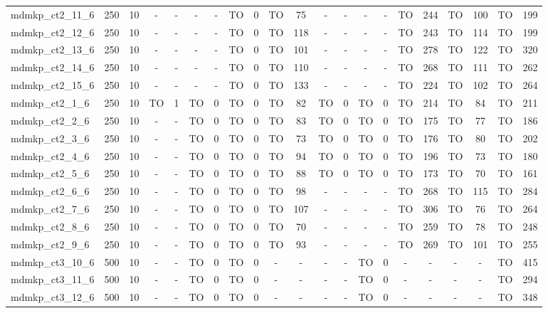 \begin{sidewaystable}[!ht]
{\begin{tabular}{lcccccccccccccccccccc}
mdmkp\_ct2\_11\_6 & 250 & 10 &  - &  - &  - &  - & TO & 0 & TO & 75 &  - &  - &  - &  - & TO & 244 & TO & 100 & TO & 199 \\
mdmkp\_ct2\_12\_6 & 250 & 10 &  - &  - &  - &  - & TO & 0 & TO & 118 &  - &  - &  - &  - & TO & 243 & TO & 114 & TO & 199 \\
mdmkp\_ct2\_13\_6 & 250 & 10 &  - &  - &  - &  - & TO & 0 & TO & 101 &  - &  - &  - &  - & TO & 278 & TO & 122 & TO & 320 \\
mdmkp\_ct2\_14\_6 & 250 & 10 &  - &  - &  - &  - & TO & 0 & TO & 110 &  - &  - &  - &  - & TO & 268 & TO & 111 & TO & 262 \\
mdmkp\_ct2\_15\_6 & 250 & 10 &  - &  - &  - &  - & TO & 0 & TO & 133 &  - &  - &  - &  - & TO & 224 & TO & 102 & TO & 264 \\
mdmkp\_ct2\_1\_6 & 250 & 10 & TO & 1 & TO & 0 & TO & 0 & TO & 82 & TO & 0 & TO & 0 & TO & 214 & TO & 84 & TO & 211 \\
mdmkp\_ct2\_2\_6 & 250 & 10 &  - &  - & TO & 0 & TO & 0 & TO & 83 & TO & 0 & TO & 0 & TO & 175 & TO & 77 & TO & 186 \\
mdmkp\_ct2\_3\_6 & 250 & 10 &  - &  - & TO & 0 & TO & 0 & TO & 73 & TO & 0 & TO & 0 & TO & 176 & TO & 80 & TO & 202 \\
mdmkp\_ct2\_4\_6 & 250 & 10 &  - &  - & TO & 0 & TO & 0 & TO & 94 & TO & 0 & TO & 0 & TO & 196 & TO & 73 & TO & 180 \\
mdmkp\_ct2\_5\_6 & 250 & 10 &  - &  - & TO & 0 & TO & 0 & TO & 88 & TO & 0 & TO & 0 & TO & 173 & TO & 70 & TO & 161 \\
mdmkp\_ct2\_6\_6 & 250 & 10 &  - &  - & TO & 0 & TO & 0 & TO & 98 &  - &  - &  - &  - & TO & 268 & TO & 115 & TO & 284 \\
mdmkp\_ct2\_7\_6 & 250 & 10 &  - &  - & TO & 0 & TO & 0 & TO & 107 &  - &  - &  - &  - & TO & 306 & TO & 76 & TO & 264 \\
mdmkp\_ct2\_8\_6 & 250 & 10 &  - &  - & TO & 0 & TO & 0 & TO & 70 &  - &  - &  - &  - & TO & 259 & TO & 78 & TO & 248 \\
mdmkp\_ct2\_9\_6 & 250 & 10 &  - &  - & TO & 0 & TO & 0 & TO & 93 &  - &  - &  - &  - & TO & 269 & TO & 101 & TO & 255 \\
mdmkp\_ct3\_10\_6 & 500 & 10 &  - &  - & TO & 0 & TO & 0 &  - &  - &  - &  - & TO & 0 &  - &  - &  - &  - & TO & 415 \\
mdmkp\_ct3\_11\_6 & 500 & 10 &  - &  - & TO & 0 & TO & 0 &  - &  - &  - &  - & TO & 0 &  - &  - &  - &  - & TO & 294 \\
mdmkp\_ct3\_12\_6 & 500 & 10 &  - &  - & TO & 0 & TO & 0 &  - &  - &  - &  - & TO & 0 &  - &  - &  - &  - & TO & 348 \\

\end{tabular}}
\end{sidewaystable}
